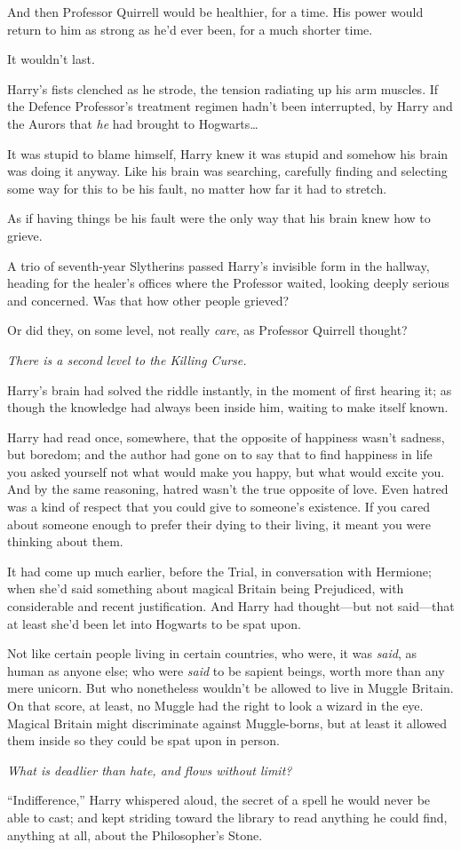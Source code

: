 And then Professor Quirrell would be healthier, for a time. His power would return to him as strong as he’d ever been, for a much shorter time.

It wouldn’t last.

Harry’s fists clenched as he strode, the tension radiating up his arm muscles. If the Defence Professor’s treatment regimen hadn’t been interrupted, by Harry and the Aurors that \emph{he} had brought to Hogwarts…

It was stupid to blame himself, Harry knew it was stupid and somehow his brain was doing it anyway. Like his brain was searching, carefully finding and selecting some way for this to be his fault, no matter how far it had to stretch.

As if having things be his fault were the only way that his brain knew how to grieve.

A trio of seventh-year Slytherins passed Harry’s invisible form in the hallway, heading for the healer’s offices where the Professor waited, looking deeply serious and concerned. Was that how other people grieved?

Or did they, on some level, not really \emph{care}, as Professor Quirrell thought?

\emph{There is a second level to the Killing Curse.}

Harry’s brain had solved the riddle instantly, in the moment of first hearing it; as though the knowledge had always been inside him, waiting to make itself known.

Harry had read once, somewhere, that the opposite of happiness wasn’t sadness, but boredom; and the author had gone on to say that to find happiness in life you asked yourself not what would make you happy, but what would excite you. And by the same reasoning, hatred wasn’t the true opposite of love. Even hatred was a kind of respect that you could give to someone’s existence. If you cared about someone enough to prefer their dying to their living, it meant you were thinking about them.

It had come up much earlier, before the Trial, in conversation with Hermione; when she’d said something about magical Britain being Prejudiced, with considerable and recent justification. And Harry had thought—but not said—that at least she’d been let into Hogwarts to be spat upon.

Not like certain people living in certain countries, who were, it was \emph{said}, as human as anyone else; who were \emph{said} to be sapient beings, worth more than any mere unicorn. But who nonetheless wouldn’t be allowed to live in Muggle Britain. On that score, at least, no Muggle had the right to look a wizard in the eye. Magical Britain might discriminate against Muggle-borns, but at least it allowed them inside so they could be spat upon in person.

\emph{What is deadlier than hate, and flows without limit?}

“Indifference,” Harry whispered aloud, the secret of a spell he would never be able to cast; and kept striding toward the library to read anything he could find, anything at all, about the Philosopher’s Stone.

